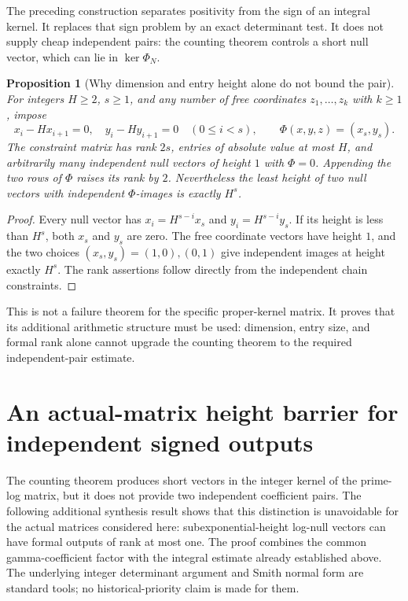 \documentclass[11pt,a4paper]{article}
\newtheorem{proposition}[theorem]{Proposition}
\theoremstyle{definition}
\theoremstyle{remark}
\begin{document}
The preceding construction separates positivity from the sign of an
integral kernel. It replaces that sign problem by an exact determinant
test. It does not supply cheap independent pairs: the counting theorem
controls a short null vector, which can lie in $\ker\Phi_N$.

\begin{proposition}[Why dimension and entry height alone do not bound the pair]
\label{stage3-counting-countermodel}
For integers $H\ge2$, $s\ge1$, and any number of free coordinates
$z_1,\ldots,z_k$ with $k\ge1$, impose
\[
 x_i-Hx_{i+1}=0,\quad y_i-Hy_{i+1}=0\quad(0\le i<s),
 \qquad\Phi(x,y,z)=(x_s,y_s).
\]
The constraint matrix has rank $2s$, entries of absolute value at most
$H$, and arbitrarily many independent null vectors of height $1$ with
$\Phi=0$. Appending the two rows of $\Phi$ raises its rank by $2$.
Nevertheless the least height of two null vectors with independent
$\Phi$-images is exactly $H^s$.
\end{proposition}

\begin{proof}
Every null vector has
$x_i=H^{s-i}x_s$ and $y_i=H^{s-i}y_s$. If its height is less than
$H^s$, both $x_s$ and $y_s$ are zero. The free coordinate vectors have
height $1$, and the two choices $(x_s,y_s)=(1,0),(0,1)$ give independent
images at height exactly $H^s$. The rank assertions follow directly
from the independent chain constraints.
\end{proof}

This is not a failure theorem for the specific proper-kernel matrix.
It proves that its additional arithmetic structure must be used:
dimension, entry size, and formal rank alone cannot upgrade the
counting theorem to the required independent-pair estimate.



\section{An actual-matrix height barrier for independent signed outputs}
\label{unified-signed-height-section}

The counting theorem produces short vectors in the integer kernel of the
prime-log matrix, but it does not provide two independent coefficient
pairs.  The following additional synthesis result shows that this
distinction is unavoidable for the actual matrices considered here:
subexponential-height log-null vectors can have formal outputs of rank
at most one.  The proof combines the common gamma-coefficient factor
with the integral estimate already established above.  The underlying
integer determinant argument and Smith normal form are standard tools;
no historical-priority claim is made for them.
\end{document}
